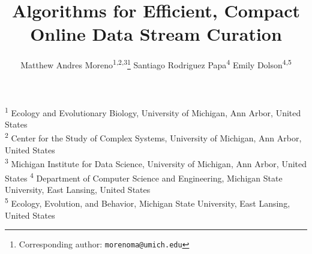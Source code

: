 \title{ Algorithms for Efficient, Compact Online Data Stream Curation }
\author{
    Matthew Andres Moreno\textsuperscript{1,2,3}\thanks{Corresponding author: \texttt{morenoma@umich.edu}} \quad
    Santiago Rodriguez Papa\textsuperscript{4} \quad
    Emily Dolson\textsuperscript{4,5} \quad
}
\date{}

\newcommand{\affil}[1]{\textsuperscript{#1}}
\newcommand{\affiliations}{
\affil{1} Ecology and Evolutionary Biology, University of Michigan, Ann Arbor, United States \\
\affil{2} Center for the Study of Complex Systems, University of Michigan, Ann Arbor, United States \\
\affil{3} Michigan Institute for Data Science, University of Michigan, Ann Arbor, United States
\affil{4} Department of Computer Science and Engineering, Michigan State University, East Lansing, United States \\
\affil{5} Ecology, Evolution, and Behavior, Michigan State University, East Lansing, United States \\
}

\maketitle

\begin{center}
\affiliations
\end{center}


